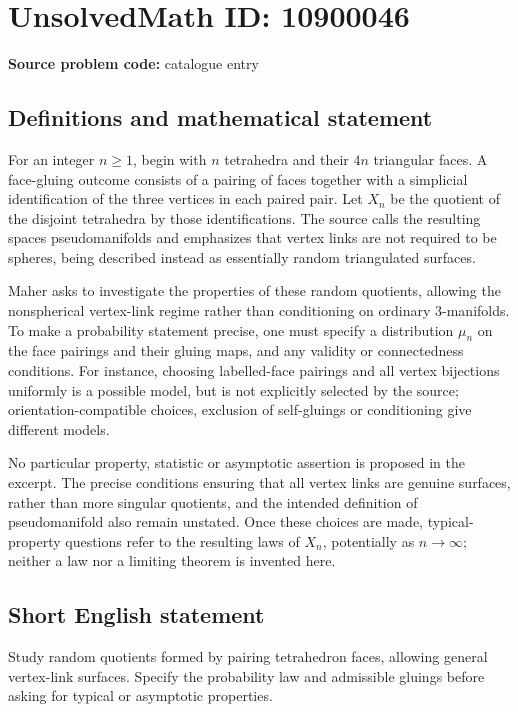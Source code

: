 \documentclass[11pt]{article}
\begin{document}
\section*{UnsolvedMath ID: 10900046}
\textbf{Source problem code:} catalogue entry
\subsection{Definitions and mathematical statement}
For an integer \(n\geq1\), begin with \(n\) tetrahedra and their \(4n\) triangular faces. A face-gluing outcome consists of a pairing of faces together with a simplicial identification of the three vertices in each paired pair. Let \(X_n\) be the quotient of the disjoint tetrahedra by those identifications. The source calls the resulting spaces pseudomanifolds and emphasizes that vertex links are not required to be spheres, being described instead as essentially random triangulated surfaces.

Maher asks to investigate the properties of these random quotients, allowing the nonspherical vertex-link regime rather than conditioning on ordinary \(3\)-manifolds. To make a probability statement precise, one must specify a distribution \(\mu_n\) on the face pairings and their gluing maps, and any validity or connectedness conditions. For instance, choosing labelled-face pairings and all vertex bijections uniformly is a possible model, but is not explicitly selected by the source; orientation-compatible choices, exclusion of self-gluings or conditioning give different models.

No particular property, statistic or asymptotic assertion is proposed in the excerpt. The precise conditions ensuring that all vertex links are genuine surfaces, rather than more singular quotients, and the intended definition of pseudomanifold also remain unstated. Once these choices are made, typical-property questions refer to the resulting laws of \(X_n\), potentially as \(n\to\infty\); neither a law nor a limiting theorem is invented here.
\subsection{Short English statement}
Study random quotients formed by pairing tetrahedron faces, allowing general vertex-link surfaces. Specify the probability law and admissible gluings before asking for typical or asymptotic properties.
\end{document}
